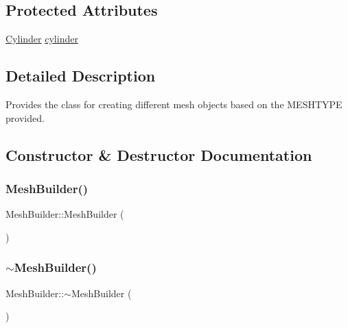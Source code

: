 \subsection*{Protected Attributes}
\begin{DoxyCompactItemize}
\item 
\mbox{\hyperlink{class_cylinder}{Cylinder}} \mbox{\hyperlink{class_mesh_builder_aba5364c12c71c36af6a83b6c3853af5b}{cylinder}}
\end{DoxyCompactItemize}


\subsection{Detailed Description}
Provides the class for creating different mesh objects based on the M\+E\+S\+H\+T\+Y\+PE provided. 

\subsection{Constructor \& Destructor Documentation}
\mbox{\label{class_mesh_builder_a13fe22fd14a85f789dc9d7d4a8d2419d}} 
\subsubsection{\texorpdfstring{MeshBuilder()}{MeshBuilder()}\hspace{0.1cm}{\footnotesize\ttfamily [1/2]}}
{\footnotesize\ttfamily Mesh\+Builder\+::\+Mesh\+Builder (\begin{DoxyParamCaption}{ }\end{DoxyParamCaption})}

\mbox{\label{class_mesh_builder_ac409c889085089b34c5297cf7150f49d}} 
\subsubsection{\texorpdfstring{$\sim$MeshBuilder()}{~MeshBuilder()}\hspace{0.1cm}{\footnotesize\ttfamily [1/3]}}
{\footnotesize\ttfamily Mesh\+Builder\+::$\sim$\+Mesh\+Builder (\begin{DoxyParamCaption}{ }\end{DoxyParamCaption})}

